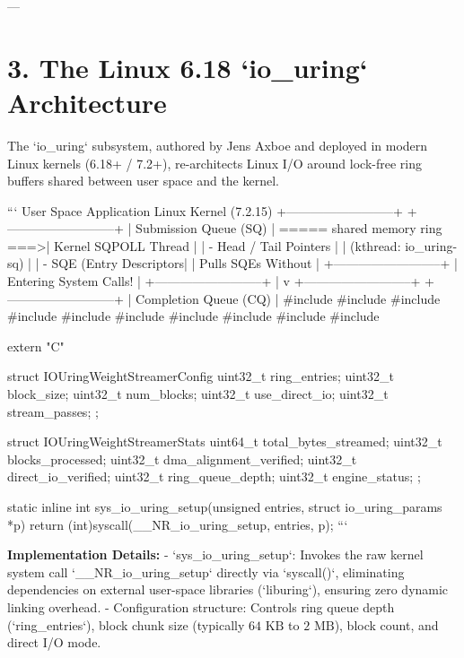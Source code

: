 \documentclass[11pt,twoside,openright]{amsbook}
\begin{document}
{{{{{{{---

\section{3. The Linux 6.18 `io_uring` Architecture}

The `io_uring` subsystem, authored by Jens Axboe and deployed in modern Linux kernels (6.18+ / 7.2+), re-architects Linux I/O around lock-free ring buffers shared between user space and the kernel.

```
User Space Application                                    Linux Kernel (7.2.15)
+--------------------------+                              +--------------------------+
|  Submission Queue (SQ)   | ===== shared memory ring ===>|  Kernel SQPOLL Thread    |
|  - Head / Tail Pointers  |                              |  (kthread: io_uring-sq)  |
|  - SQE (Entry Descriptors|                              |  Pulls SQEs Without      |
+--------------------------+                              |  Entering System Calls!  |
                                                          +--------------------------+
                                                                       |
                                                                       v
+--------------------------+                              +--------------------------+
|  Completion Queue (CQ)   | 
#include 
#include 
#include 
#include 
#include 
#include 
#include 
#include 
#include 
#include 

extern "C" {

struct IOUringWeightStreamerConfig {
    uint32_t ring_entries;
    uint32_t block_size;
    uint32_t num_blocks;
    uint32_t use_direct_io;
    uint32_t stream_passes;
};

struct IOUringWeightStreamerStats {
    uint64_t total_bytes_streamed;
    uint32_t blocks_processed;
    uint32_t dma_alignment_verified;
    uint32_t direct_io_verified;
    uint32_t ring_queue_depth;
    uint32_t engine_status;
};

static inline int sys_io_uring_setup(unsigned entries, struct io_uring_params *p) {
    return (int)syscall(__NR_io_uring_setup, entries, p);
}
```

\textbf{Implementation Details:}
- `sys_io_uring_setup`: Invokes the raw kernel system call `__NR_io_uring_setup` directly via `syscall()`, eliminating dependencies on external user-space libraries (`liburing`), ensuring zero dynamic linking overhead.
- Configuration structure: Controls ring queue depth (`ring_entries`), block chunk size (typically $64\text{ KB}$ to $2\text{ MB}$), block count, and direct I/O mode.

}}}}}}}}
\end{document}
